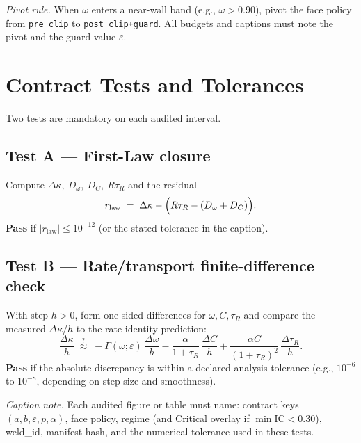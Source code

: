 \noindent\textit{Pivot rule.} When \(\omega\) enters a near-wall band (e.g., \(\omega>0.90\)), pivot the face policy from \texttt{pre\_clip} to \texttt{post\_clip+guard}.
All budgets and captions must note the pivot and the guard value \(\varepsilon\).

\section{Contract Tests and Tolerances}
Two tests are mandatory on each audited interval.

\subsection*{Test A — First-Law closure}
Compute \(\Delta\kappa,\ D_{\omega},\ D_{C},\ R\tau_{R}\) and the residual
\[
r_{\text{law}} \;=\; \Delta\kappa - \Bigl(R\tau_{R} - (D_{\omega}+D_{C})\Bigr).
\]
\textbf{Pass} if \(|r_{\text{law}}|\le 10^{-12}\) (or the stated tolerance in the caption).

\subsection*{Test B — Rate/transport finite-difference check}
With step \(h>0\), form one-sided differences for \(\omega,C,\tau_{R}\) and compare the measured
\(\Delta\kappa/h\) to the rate identity prediction:
\[
\frac{\Delta\kappa}{h}\;\stackrel{?}{\approx}\; -\Gamma(\omega;\varepsilon)\,\frac{\Delta\omega}{h}
              - \frac{\alpha}{1+\tau_{R}}\,\frac{\Delta C}{h}
              + \frac{\alpha C}{(1+\tau_{R})^{2}}\,\frac{\Delta \tau_{R}}{h}.
\]
\textbf{Pass} if the absolute discrepancy is within a declared analysis tolerance (e.g., \(10^{-6}\) to \(10^{-8}\), depending on step size and smoothness).

\medskip
\noindent\textit{Caption note.} Each audited figure or table must name: contract keys \((a,b,\varepsilon,p,\alpha)\), face policy, regime (and Critical overlay if \(\min\mathrm{IC}<0.30\)), weld\_id, manifest hash, and the numerical tolerance used in these tests.
